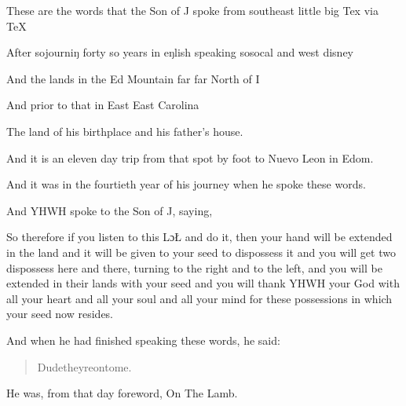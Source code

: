 
\Sentence
{ \hX{} }
{ \eX{} }
{
    These are the words that the Son of J spoke from southeast little big Tex via TeX

    After sojourniŋ forty so years in eŋlish speaking sosocal and west disney

    And the lands in the Ed Mountain far far North of I

    And prior to that in East East Carolina

    The land of his birthplace and his father's house.
}

\Sentence
{ \hX{} }
{ \eX{} }
{
    And it is an eleven day trip from that spot by foot to Nuevo Leon in Edom.

    And it was in the fourtieth year of his journey when he spoke these words.
}



\Sentence
{ \hX{} }
{ \eX{} }
{
    And YHWH spoke to the Son of J, saying,

    So therefore if you listen to this LɔŁ and do it, then your hand will be extended in the land and it will be given to your seed to dispossess it and you will get two dispossess here and there, turning to the right and to the left, and you will be extended in their lands with your seed and you will thank YHWH your God with all your heart and all your soul and all your mind for these possessions in which your seed now resides.
}


\Sentence
{ \hX{} }
{ \eX{} }
{
    And when he had finished speaking these words, he said:
    \begin{quote}
        Dudetheyreontome.
    \end{quote}
}

\Sentence
{ \hX{} }
{ \eX{} }
{
    He was, from that day foreword, On The Lamb.

}
